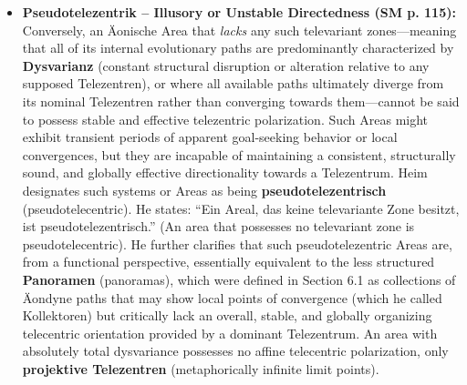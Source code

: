\documentclass[12pt]{article}
\newcommand{\q}[1]{\enquote{#1}}
\begin{document}
\begin{itemize}
    \item \textbf{Pseudotelezentrik – Illusory or Unstable Directedness (SM p. 115):}
    Conversely, an Äonische Area that \textit{lacks} any such televariant zones—meaning that all of its internal evolutionary paths are predominantly characterized by \textbf{Dysvarianz} (constant structural disruption or alteration relative to any supposed Telezentren), or where all available paths ultimately diverge from its nominal Telezentren rather than converging towards them—cannot be said to possess stable and effective telezentric polarization. Such Areas might exhibit transient periods of apparent goal-seeking behavior or local convergences, but they are incapable of maintaining a consistent, structurally sound, and globally effective directionality towards a Telezentrum.
    Heim designates such systems or Areas as being \textbf{pseudotelezentrisch} (pseudotelecentric). He states: \q{Ein Areal, das keine televariante Zone besitzt, ist pseudotelezentrisch.} (An area that possesses no televariant zone is pseudotelecentric). He further clarifies that such pseudotelezentric Areas are, from a functional perspective, essentially equivalent to the less structured \textbf{Panoramen} (panoramas), which were defined in Section 6.1 as collections of Äondyne paths that may show local points of convergence (which he called Kollektoren) but critically lack an overall, stable, and globally organizing telecentric orientation provided by a dominant Telezentrum. An area with absolutely total dysvariance possesses no affine telecentric polarization, only \textbf{projektive Telezentren} (metaphorically infinite limit points).


\end{itemize}
\end{document}
